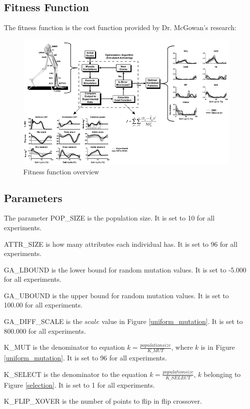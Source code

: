 \subsection{Fitness Function}
\label{sec:fitness}
The fitness function is the cost function provided by Dr. McGowan's research:
\begin{figure}[!h]
        \begin{center}
                \includegraphics[width=130mm]{images/fitness_func}
                \caption{Fitness function overview \cite{mcgowan-fit}}
                \label{fitness_func_pic}
        \end{center}
\end{figure}
\pagebreak

\subsection{Parameters}
The parameter POP\_SIZE is the population size. It is set to 10 for all 
experiments.

ATTR\_SIZE is how many attributes each individual has. It is set to 96 for all
experiments.
	
GA\_LBOUND is the lower bound for random mutation values. It is set to
-5.000 for all experiments.

GA\_UBOUND is the upper bound for random mutation values. It is set to 
100.00 for all experiments.

GA\_DIFF\_SCALE is the $ scale $ value in Figure \ref{uniform_mutation}. It
is set to 800.000 for all experiments.

K\_MUT is the denominator to equation $ k = \frac{population size}{K\_MUT} $, 
where $ k $ is in Figure \ref{uniform_mutation}. It is set to 96 for all
experiments.

K\_SELECT is the denominator to the equation 
$ k = \frac{population size}{K\_SELECT} $, $ k $ belonging to Figure 
\ref{selection}. It is set to 1 for all experiments.

K\_FLIP\_XOVER is the number of points to flip in flip crossover.

